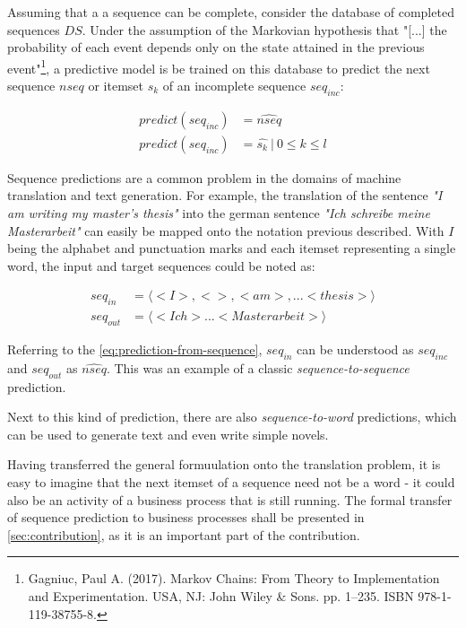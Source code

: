 Assuming that a a sequence can be complete, consider the database of completed sequences $DS$. Under the assumption of the Markovian hypothesis that "[...] the probability of each event depends only on the state attained in the previous event"\footnote{Gagniuc, Paul A. (2017). Markov Chains: From Theory to Implementation and Experimentation. USA, NJ: John Wiley \& Sons. pp. 1–235. ISBN 978-1-119-38755-8.}, a predictive model is be trained on this database to predict the next sequence $nseq$ or itemset $s_k$ of an incomplete sequence $seq_{inc}$:

\begin{equation}
\begin{split}
    predict(seq_{inc}) &= \widehat{nseq}\\ predict(seq_{inc}) &= \hat{s_k}\ |\ 0 \leq k \leq l
\end{split}
\label{eq:prediction-from-sequence}
\end{equation}

Sequence predictions are a common problem in the domains of machine translation and text generation. For example, the translation of the sentence \textit{"I am writing my master's thesis"} into the german sentence \textit{"Ich schreibe meine Masterarbeit"} can easily be mapped onto the notation previous described. With $I$ being the alphabet and punctuation marks and each itemset representing a single word, the input and target sequences could be noted as:

\begin{equation*}
\begin{split}
seq_{in} &= \langle<I>, < >, <am>, ... <thesis>\rangle\\
seq_{out} &= \langle<Ich> ... <Masterarbeit>\rangle
\end{split}
\end{equation*}

Referring to the \autoref{eq:prediction-from-sequence}, $seq_{in}$ can be understood as $seq_{inc}$ and $seq_{out}$ as $\widehat{nseq}$. This was an example of a classic \textit{sequence-to-sequence} prediction.

Next to this kind of prediction, there are also \textit{sequence-to-word} predictions, which can be used to generate text and even write simple novels.

Having transferred the general formuulation onto the translation problem, it is easy to imagine that the next itemset of a sequence need not be a word - it could also be an activity of a business process that is still running. The formal transfer of sequence prediction to business processes shall be presented in \autoref{sec:contribution}, as it is an important part of the contribution.

